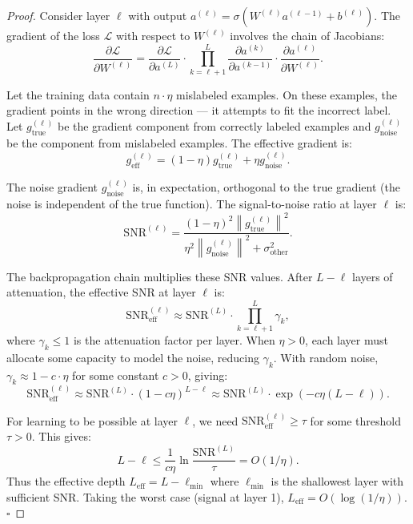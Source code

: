 \documentclass[12pt,a4paper]{article}
\theoremstyle{definition}
\newcommand{\norm}[1]{\left\lVert#1\right\rVert}
\begin{document}
\begin{proof}
Consider layer $\ell$ with output $a^{(\ell)} = \sigma(W^{(\ell)} a^{(\ell-1)} + b^{(\ell)})$. The gradient of the loss $\mathcal{L}$ with respect to $W^{(\ell)}$ involves the chain of Jacobians:
\begin{equation}
    \frac{\partial \mathcal{L}}{\partial W^{(\ell)}} = \frac{\partial \mathcal{L}}{\partial a^{(L)}} \cdot \prod_{k=\ell+1}^{L} \frac{\partial a^{(k)}}{\partial a^{(k-1)}} \cdot \frac{\partial a^{(\ell)}}{\partial W^{(\ell)}}.
\end{equation}

Let the training data contain $n \cdot \eta$ mislabeled examples. On these examples, the gradient points in the wrong direction — it attempts to fit the incorrect label. Let $g_{\text{true}}^{(\ell)}$ be the gradient component from correctly labeled examples and $g_{\text{noise}}^{(\ell)}$ be the component from mislabeled examples. The effective gradient is:
\begin{equation}
    g_{\text{eff}}^{(\ell)} = (1-\eta) g_{\text{true}}^{(\ell)} + \eta g_{\text{noise}}^{(\ell)}.
\end{equation}

The noise gradient $g_{\text{noise}}^{(\ell)}$ is, in expectation, orthogonal to the true gradient (the noise is independent of the true function). The signal-to-noise ratio at layer $\ell$ is:
\begin{equation}
    \text{SNR}^{(\ell)} = \frac{(1-\eta)^2 \norm{g_{\text{true}}^{(\ell)}}^2}{\eta^2 \norm{g_{\text{noise}}^{(\ell)}}^2 + \sigma_{\text{other}}^2}.
\end{equation}

The backpropagation chain multiplies these SNR values. After $L-\ell$ layers of attenuation, the effective SNR at layer $\ell$ is:
\begin{equation}
    \text{SNR}_{\text{eff}}^{(\ell)} \approx \text{SNR}^{(L)} \cdot \prod_{k=\ell+1}^{L} \gamma_k,
\end{equation}
where $\gamma_k \le 1$ is the attenuation factor per layer. When $\eta > 0$, each layer must allocate some capacity to model the noise, reducing $\gamma_k$. With random noise, $\gamma_k \approx 1 - c \cdot \eta$ for some constant $c > 0$, giving:
\begin{equation}
    \text{SNR}_{\text{eff}}^{(\ell)} \approx \text{SNR}^{(L)} \cdot (1 - c\eta)^{L-\ell} \approx \text{SNR}^{(L)} \cdot \exp(-c\eta(L-\ell)).
\end{equation}

For learning to be possible at layer $\ell$, we need $\text{SNR}_{\text{eff}}^{(\ell)} \ge \tau$ for some threshold $\tau > 0$. This gives:
\begin{equation}
    L - \ell \le \frac{1}{c\eta} \ln\frac{\text{SNR}^{(L)}}{\tau} = O(1/\eta).
\end{equation}
Thus the effective depth $L_{\text{eff}} = L - \ell_{\min}$ where $\ell_{\min}$ is the shallowest layer with sufficient SNR. Taking the worst case (signal at layer 1), $L_{\text{eff}} = O(\log(1/\eta))$. \hfill $\square$
\end{proof}
\end{document}

